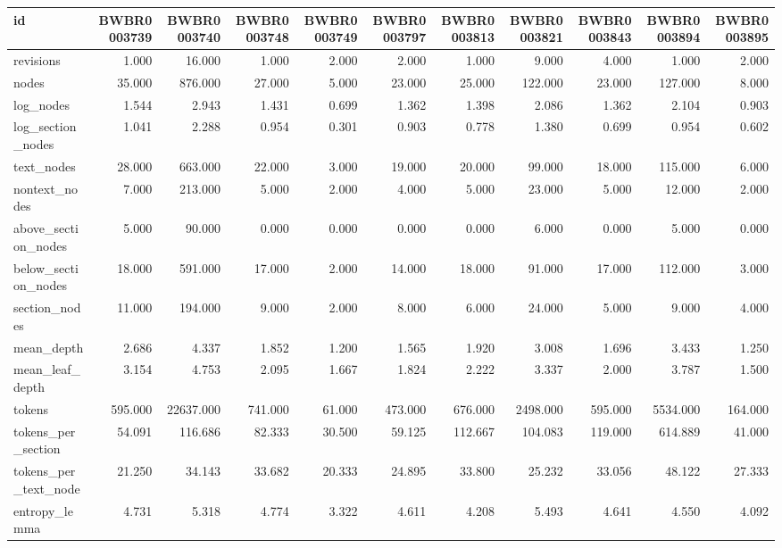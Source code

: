 \begin{tabular}{lrrrrrrrrrr}
\toprule
id & BWBR0003739 & BWBR0003740 & BWBR0003748 & BWBR0003749 & BWBR0003797 & BWBR0003813 & BWBR0003821 & BWBR0003843 & BWBR0003894 & BWBR0003895 \\
\midrule
revisions & 1.000 & 16.000 & 1.000 & 2.000 & 2.000 & 1.000 & 9.000 & 4.000 & 1.000 & 2.000 \\
\cline{1-11}
nodes & 35.000 & 876.000 & 27.000 & 5.000 & 23.000 & 25.000 & 122.000 & 23.000 & 127.000 & 8.000 \\
\cline{1-11}
log\_nodes & 1.544 & 2.943 & 1.431 & 0.699 & 1.362 & 1.398 & 2.086 & 1.362 & 2.104 & 0.903 \\
\cline{1-11}
log\_section\_nodes & 1.041 & 2.288 & 0.954 & 0.301 & 0.903 & 0.778 & 1.380 & 0.699 & 0.954 & 0.602 \\
\cline{1-11}
text\_nodes & 28.000 & 663.000 & 22.000 & 3.000 & 19.000 & 20.000 & 99.000 & 18.000 & 115.000 & 6.000 \\
\cline{1-11}
nontext\_nodes & 7.000 & 213.000 & 5.000 & 2.000 & 4.000 & 5.000 & 23.000 & 5.000 & 12.000 & 2.000 \\
\cline{1-11}
above\_section\_nodes & 5.000 & 90.000 & 0.000 & 0.000 & 0.000 & 0.000 & 6.000 & 0.000 & 5.000 & 0.000 \\
\cline{1-11}
below\_section\_nodes & 18.000 & 591.000 & 17.000 & 2.000 & 14.000 & 18.000 & 91.000 & 17.000 & 112.000 & 3.000 \\
\cline{1-11}
section\_nodes & 11.000 & 194.000 & 9.000 & 2.000 & 8.000 & 6.000 & 24.000 & 5.000 & 9.000 & 4.000 \\
\cline{1-11}
mean\_depth & 2.686 & 4.337 & 1.852 & 1.200 & 1.565 & 1.920 & 3.008 & 1.696 & 3.433 & 1.250 \\
\cline{1-11}
mean\_leaf\_depth & 3.154 & 4.753 & 2.095 & 1.667 & 1.824 & 2.222 & 3.337 & 2.000 & 3.787 & 1.500 \\
\cline{1-11}
tokens & 595.000 & 22637.000 & 741.000 & 61.000 & 473.000 & 676.000 & 2498.000 & 595.000 & 5534.000 & 164.000 \\
\cline{1-11}
tokens\_per\_section & 54.091 & 116.686 & 82.333 & 30.500 & 59.125 & 112.667 & 104.083 & 119.000 & 614.889 & 41.000 \\
\cline{1-11}
tokens\_per\_text\_node & 21.250 & 34.143 & 33.682 & 20.333 & 24.895 & 33.800 & 25.232 & 33.056 & 48.122 & 27.333 \\
\cline{1-11}
entropy\_lemma & 4.731 & 5.318 & 4.774 & 3.322 & 4.611 & 4.208 & 5.493 & 4.641 & 4.550 & 4.092 \\

\end{tabular}
